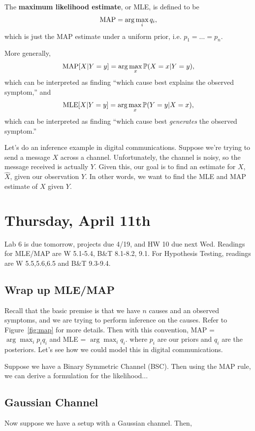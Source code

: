 \documentclass[11 pt]{scrartcl}
\begin{document}
\begin{definition}[MLE]
    The \textbf{maximum likelihood estimate}, or MLE, is defined to be 
    \[ \text{MAP} = \arg\max_i q_i,\] 
    which is just the MAP estimate under a uniform prior, i.e. $p_1 = \dots = p_n$. 
\end{definition}

More generally, 
\[ \text{MAP}[X | Y = y] = \arg\max_x \mathbb P(X = x | Y = y),\] 
which can be interpreted as finding ``which cause best explains the observed symptom,'' and 
\[ \text{MLE}[X | Y = y] = \arg\max_x \mathbb P(Y = y | X = x),\] 
which can be interpreted as finding ``which cause best \emph{generates} the observed symptom.''

Let's do an inference example in digital communications. Suppose we're trying to send a message $X$ across a channel. Unfortunately, the channel is noisy, so the message received is actually $Y$. Given this, our goal is to find an estimate for $X$, $\hat{X}$, given our observation $Y$. In other words, we want to find the MLE and MAP estimate of $X$ given $Y$. 





\newpage
\section{Thursday, April 11th}
Lab 6 is due tomorrow, projects due 4/19, and HW 10 due next Wed. Readings for MLE/MAP are W 5.1-5.4, B\&T 8.1-8.2, 9.1. For Hypothesis Testing, readings are W 5.5,5.6,6.5 and B\&T 9.3-9.4. 

\subsection{Wrap up MLE/MAP}

Recall that the basic premise is that we have $n$ causes and an observed symptoms, and we are trying to perform inference on the causes. Refer to Figure~\ref{fig:map} for more details. Then with this convention, MAP = $\arg\max_{i} p_iq_i$ and MLE = $\arg\max_i q_i$. where $p_i$ are our priors and $q_i$ are the posteriors. Let's see how we could model this in digital communications. 

Suppose we have a Binary Symmetric Channel (BSC). Then using the MAP rule, we can derive a formulation for the likelihood... 

\subsection{Gaussian Channel}
Now suppose we have a setup with a Gaussian channel. Then, 
\end{document}
